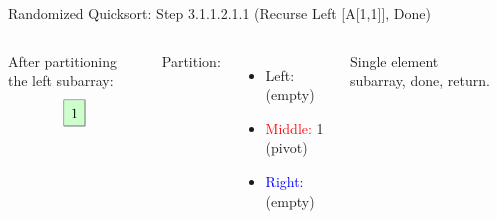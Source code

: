 \begin{frame}{Randomized Quicksort: Step 3.1.1.2.1.1 (Recurse Left [A[1,1]], Done)}
  \begin{columns}[t]
    After partitioning the left subarray:
    \[
      \renewcommand{\arraystretch}{1.5}
      \begin{array}{|c|c|c|}
        \hline
        \cellcolor{green!20}{1} \\
        \hline
      \end{array}
    \]

    Partition:
    \begin{itemize}
      \item \textcolor{green!60!black}{Left:} (empty)
      \item \textcolor{red}{Middle:} 1 (pivot)
      \item \textcolor{blue}{Right:} (empty)
    \end{itemize}
    Single element subarray, done, return.
    \begin{minipage}[t]{\linewidth}
      \vspace{0pt} %
      \begin{center}


\end{center}
\end{minipage}
\end{columns}
\end{frame}
